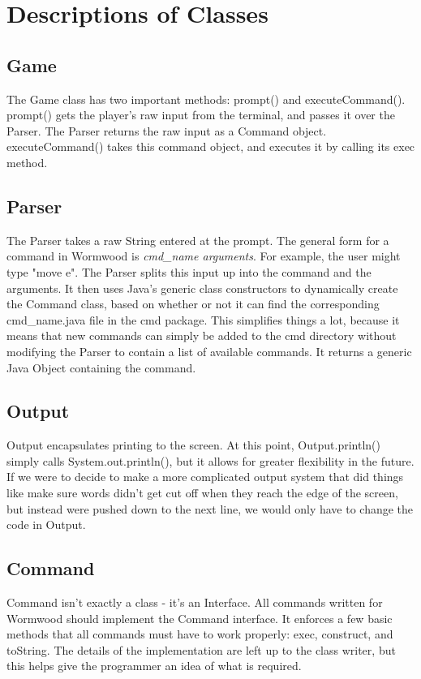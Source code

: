 \documentclass[12pt]{report}
\begin{document}
\section{Descriptions of Classes}
\subsection{Game}
The Game class has two important methods: prompt() and executeCommand(). prompt() gets the player's raw input from the terminal, and passes it over the Parser. The Parser returns the raw input as a Command object. executeCommand() takes this command object, and executes it by calling its exec method.

\subsection{Parser}
The Parser takes a raw String entered at the prompt. The general form for a command in Wormwood is \textit{cmd\_name arguments}. For example, the user might type "move e". The Parser splits this input up into the command and the arguments.  It then uses Java's generic class constructors to dynamically create the Command class, based on whether or not it can find the corresponding cmd\_name.java file in the cmd package. This simplifies things a lot, because it means that new commands can simply be added to the cmd directory without modifying the Parser to contain a list of available commands. It returns a generic Java Object containing the command. 

\subsection{Output}
Output encapsulates printing to the screen. At this point, Output.println() simply calls System.out.println(), but it allows for greater flexibility in the future. If we were to decide to make a more complicated output system that did things like make sure words didn't get cut off when they reach the edge of the screen, but instead were pushed down to the next line, we would only have to change the code in Output.


\subsection{Command}
Command isn't exactly a class - it's an Interface. All commands written for Wormwood should implement the Command interface. It enforces a few basic methods that all commands must have to work properly: exec, construct, and toString. The details of the implementation are left up to the class writer, but this helps give the programmer an idea of what is required. 
\end{document}
